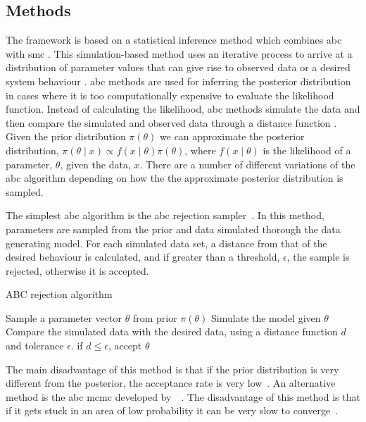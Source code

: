\subsection{Methods}

The framework is based on a statistical inference method which combines \acrfull{abc} with \acrfull{smc} \autocite{Toni:2009tr}. This simulation-based method uses an iterative process to arrive at a distribution of parameter values that can give rise to observed data or a desired system behaviour \autocite{Barnes:2011hh}.
\acrshort{abc} methods are used for inferring the posterior distribution in cases where it is too computationally expensive to evaluate the likelihood function. Instead of calculating the likelihood, \acrshort{abc} methods simulate the data and then compare the simulated and observed data through a distance function \autocite{Toni:2009tr}. Given the prior distribution $\pi(\theta)$ we can approximate the posterior distribution, $\pi(\theta\mid x)\propto f(x\mid\theta)\pi(\theta)$, where $f(x\mid\theta)$ is the likelihood of a parameter, $\theta$, given the data, $x$. There are a number of different variations of the \acrshort{abc} algorithm depending on how the the approximate posterior distribution is sampled. 
\par
The simplest \acrshort{abc} algorithm is the \acrshort{abc} rejection sampler~\autocite{Pritchard:1999td}. In this method, parameters are sampled from the prior and data simulated thorough the data generating model. For each simulated data set, a distance from that of the desired behaviour is calculated, and if greater than a threshold, $\epsilon$, the sample is rejected, otherwise it is accepted. 
\begin{algorithm}[H]
	\label{alg:ABC}
  \caption{ABC rejection algorithm}
 \begin{algorithmic}[1]
    \Statex
	\State Sample a parameter vector $\theta$ from prior $\pi(\theta)$
	\State Simulate the model given $\theta$
    \State Compare the simulated data with the desired data, using a distance function $d$ and tolerance $\epsilon$. if $d \leq \epsilon$, accept $\theta$ 
   
  \end{algorithmic}
\end{algorithm}
\noindent The main disadvantage of this method is that if the prior distribution is very different from the posterior, the acceptance rate is very low~\autocite{Toni:2009tr}. An alternative method is the \acrshort{abc} \acrfull{mcmc} developed by~\textcite{Marjoram:2003up}~\autocite{Marjoram:2003up}. The disadvantage of this method is that if it gets stuck in an area of low probability it can be very slow to converge~\autocite{Sisson:wf}. 

